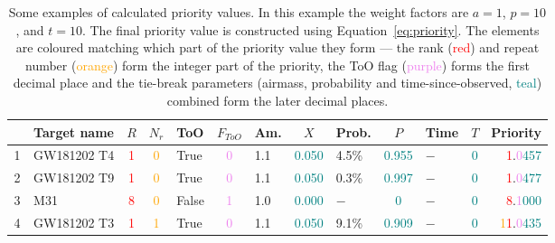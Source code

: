 \begin{colsection}
\begin{colsection}
\begin{table}
\caption{Some examples of calculated priority values. In this example the weight factors are $a=1$, $p=10$, and $t=10$. The final priority value is constructed using Equation~\ref{eq:priority}. The elements are coloured matching which part of the priority value they form --- the rank (\textcolor{red}{red}) and repeat number (\textcolor{orange}{orange}) form the integer part of the priority, the ToO flag (\textcolor{violet}{purple}) forms the first decimal place and the tie-break parameters (airmass, probability and time-since-observed, \textcolor{teal}{teal}) combined form the later decimal places.
}
\label{tab:priority}
\begin{center}
\begin{tabular}{clcclclclclcr}

\midrule
~&
\textbf{Target name} &
\textbf{$R$} &
\textbf{$N_r$} &
\textbf{ToO} &
$F_{ToO}$ &
\textbf{Am.} &
$X$ &
\textbf{Prob.} &
$P$ &
\textbf{Time} &
$T$ &
\textbf{Priority}
\\
\midrule

1 &
GW181202 T4 &
\textcolor{red}{1} &
\textcolor{orange}{0} &
True   & \textcolor{violet}{0}   &
1.1    & \textcolor{teal}{0.050} &
4.5\%  & \textcolor{teal}{0.955} &
$-$    & \textcolor{teal}{0}     &
\textcolor{orange}{~~}\textcolor{red}{1}.\textcolor{violet}{0}\textcolor{teal}{457} \\

2 &
GW181202 T9 &
\textcolor{red}{1} &
\textcolor{orange}{0} &
True   & \textcolor{violet}{0}   &
1.1    & \textcolor{teal}{0.050} &
0.3\%  & \textcolor{teal}{0.997} &
$-$    & \textcolor{teal}{0}     &
\textcolor{orange}{~~}\textcolor{red}{1}.\textcolor{violet}{0}\textcolor{teal}{477} \\

3 &
M31 &
\textcolor{red}{8} &
\textcolor{orange}{0} &
False  & \textcolor{violet}{1}   &
1.0    & \textcolor{teal}{0.000} &
$-$    & \textcolor{teal}{0}     &
$-$    & \textcolor{teal}{0}     &
\textcolor{orange}{~~}\textcolor{red}{8}.\textcolor{violet}{1}\textcolor{teal}{000} \\

4 &
GW181202 T3 &
\textcolor{red}{1} &
\textcolor{orange}{1} &
True   & \textcolor{violet}{0}   &
1.1    & \textcolor{teal}{0.050} &
9.1\%  & \textcolor{teal}{0.909} &
$-$    & \textcolor{teal}{0}     &
\textcolor{orange}{~1}\textcolor{red}{1}.\textcolor{violet}{0}\textcolor{teal}{435} \\


\end{tabular}
\end{center}
\end{table}
\end{colsection}
\end{colsection}
